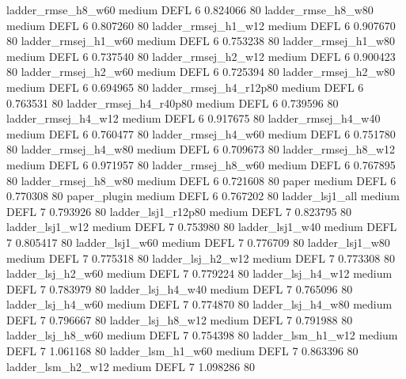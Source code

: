     ladder_rmse_h8_w60     medium     DEFL                 6 0.824066 80
    ladder_rmse_h8_w80     medium     DEFL                 6 0.807260 80
   ladder_rmsej_h1_w12     medium     DEFL                 6 0.907670 80
   ladder_rmsej_h1_w60     medium     DEFL                 6 0.753238 80
   ladder_rmsej_h1_w80     medium     DEFL                 6 0.737540 80
   ladder_rmsej_h2_w12     medium     DEFL                 6 0.900423 80
   ladder_rmsej_h2_w60     medium     DEFL                 6 0.725394 80
   ladder_rmsej_h2_w80     medium     DEFL                 6 0.694965 80
ladder_rmsej_h4_r12p80     medium     DEFL                 6 0.763531 80
ladder_rmsej_h4_r40p80     medium     DEFL                 6 0.739596 80
   ladder_rmsej_h4_w12     medium     DEFL                 6 0.917675 80
   ladder_rmsej_h4_w40     medium     DEFL                 6 0.760477 80
   ladder_rmsej_h4_w60     medium     DEFL                 6 0.751780 80
   ladder_rmsej_h4_w80     medium     DEFL                 6 0.709673 80
   ladder_rmsej_h8_w12     medium     DEFL                 6 0.971957 80
   ladder_rmsej_h8_w60     medium     DEFL                 6 0.767895 80
   ladder_rmsej_h8_w80     medium     DEFL                 6 0.721608 80
                 paper     medium     DEFL                 6 0.770308 80
          paper_plugin     medium     DEFL                 6 0.767202 80
       ladder_lsj1_all     medium     DEFL                 7 0.793926 80
    ladder_lsj1_r12p80     medium     DEFL                 7 0.823795 80
       ladder_lsj1_w12     medium     DEFL                 7 0.753980 80
       ladder_lsj1_w40     medium     DEFL                 7 0.805417 80
       ladder_lsj1_w60     medium     DEFL                 7 0.776709 80
       ladder_lsj1_w80     medium     DEFL                 7 0.775318 80
     ladder_lsj_h2_w12     medium     DEFL                 7 0.773308 80
     ladder_lsj_h2_w60     medium     DEFL                 7 0.779224 80
     ladder_lsj_h4_w12     medium     DEFL                 7 0.783979 80
     ladder_lsj_h4_w40     medium     DEFL                 7 0.765096 80
     ladder_lsj_h4_w60     medium     DEFL                 7 0.774870 80
     ladder_lsj_h4_w80     medium     DEFL                 7 0.796667 80
     ladder_lsj_h8_w12     medium     DEFL                 7 0.791988 80
     ladder_lsj_h8_w60     medium     DEFL                 7 0.754398 80
     ladder_lsm_h1_w12     medium     DEFL                 7 1.061168 80
     ladder_lsm_h1_w60     medium     DEFL                 7 0.863396 80
     ladder_lsm_h2_w12     medium     DEFL                 7 1.098286 80
